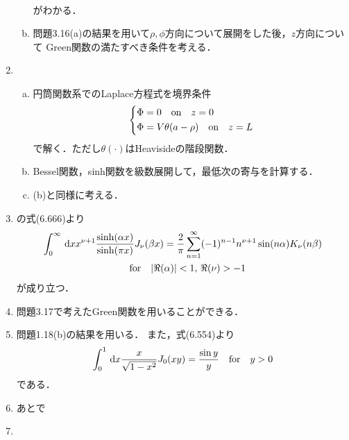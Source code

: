 \begin{enumerate}[label={\large 3.\arabic*}]
\begin{enumerate}[(a)]
\begin{gather}
        \end{gather}%
        がわかる．
      \item 問題3.16(a)の結果を用いて$\rho, \phi$方向について展開をした後，$z$方向について
        Green関数の満たすべき条件を考える．
    \end{enumerate}
  \item 
    \begin{enumerate}[(a)]%
      \item  円筒関数系でのLaplace方程式を境界条件
        \begin{gather}%
          \begin{dcases}%
            \Phi = 0\qqtext{on} z = 0\\
            \Phi = V\theta(a-\rho) \qqtext{on} z = L
          \end{dcases}%
        \end{gather}%
        で解く．ただし$\theta(\cdot)$はHeavisideの階段関数．
      \item Bessel関数，sinh関数を級数展開して，最低次の寄与を計算する．
      \item (b)と同様に考える．
    \end{enumerate}%
  \item 
    \cite{gradshteyn2014}の式(6.666)より
    \begin{multline}%
      \int_0^\infty \dl{x} x^{\nu +1} \frac{\sinh(\alpha x)}{\sinh(\pi x)} J_\nu(\beta x)
      = \frac{2}{\pi}\sum_{n=1}^\infty (-1)^{n-1} n^{\nu+1}\sin(n\alpha) K_\nu(n\beta)\\
      \qqtext{for} |\Re(\alpha)| < 1,\, \Re(\nu) > -1
    \end{multline}%
    が成り立つ．
  \item 問題3.17で考えたGreen関数を用いることができる．
  \item 問題1.18(b)の結果を用いる．
    また，\cite{gradshteyn2014}式(6.554)より
    \begin{gather}%
      \int_0^1  \dl{x} \frac{x}{\sqrt{1-x^2}} J_0(xy) = \frac{\sin y}{y} \qqtext{for} y > 0
    \end{gather}%
    である．
  \item あとで
  \item 
\end{enumerate}
